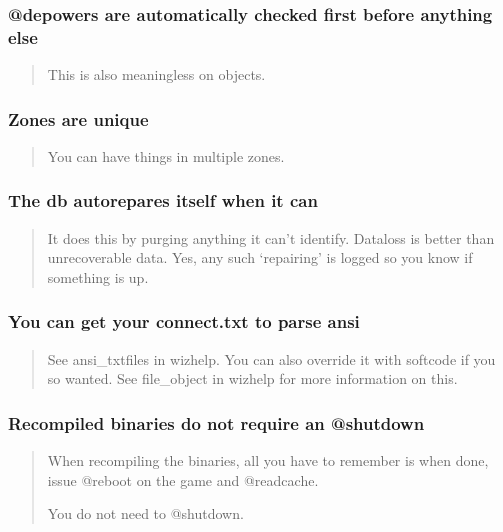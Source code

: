 \documentclass[letterpaper,10pt,english]{sphinxmanual}
\begin{document}
\subsubsection{@depowers are automatically checked first before anything else}
\label{\detokenize{features:depowers-are-automatically-checked-first-before-anything-else}}\begin{quote}

\sphinxAtStartPar
This is also meaningless on objects.
\end{quote}


\subsubsection{Zones are unique}
\label{\detokenize{features:zones-are-unique}}\begin{quote}

\sphinxAtStartPar
You can have things in multiple zones.
\end{quote}


\subsubsection{The db auto\sphinxhyphen{}repares itself when it can}
\label{\detokenize{features:the-db-auto-repares-itself-when-it-can}}\begin{quote}

\sphinxAtStartPar
It does this by purging anything
it can’t identify.  Dataloss is better than unrecoverable data.
Yes, any such ‘repairing’ is logged so you know if something is up.
\end{quote}


\subsubsection{You can get your connect.txt to parse ansi}
\label{\detokenize{features:you-can-get-your-connect-txt-to-parse-ansi}}\begin{quote}

\sphinxAtStartPar
See ansi\_txtfiles in wizhelp.
You can also override it with softcode if you so wanted.
See file\_object in wizhelp for more information on this.
\end{quote}


\subsubsection{Re\sphinxhyphen{}compiled binaries do not require an @shutdown}
\label{\detokenize{features:re-compiled-binaries-do-not-require-an-shutdown}}\begin{quote}

\sphinxAtStartPar
When re\sphinxhyphen{}compiling the binaries, all you have to remember is when done, issue
@reboot on the game and @readcache.

\sphinxAtStartPar
You do not need to @shutdown.
\end{quote}
\end{document}
